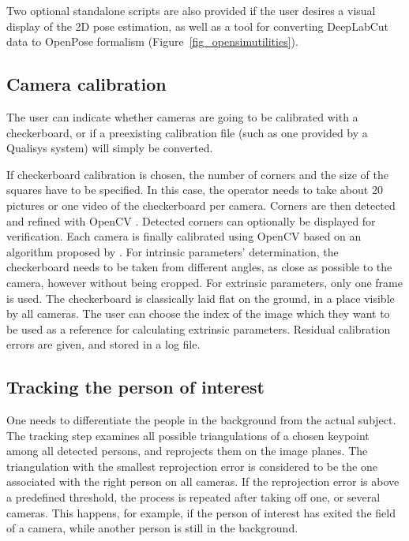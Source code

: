 
Two optional standalone scripts are also provided if the user desires a visual display of the 2D pose estimation, as well as a tool for converting DeepLabCut data to OpenPose formalism (Figure~\ref{fig_opensimutilities}).


\subsection{Camera calibration}

The user can indicate whether cameras are going to be calibrated with a checkerboard, or if a preexisting calibration file (such as one provided by a Qualisys system) will simply be converted.

If checkerboard calibration is chosen, the number of corners and the size of the squares have to be specified. In this case, the operator needs to take about 20 pictures or one video of the checkerboard per camera. Corners are then detected and refined with OpenCV \cite{Bradski2000}. Detected corners can optionally be displayed for verification. Each camera is finally calibrated using OpenCV based on an algorithm proposed by \cite{Zhang2000}. For intrinsic parameters' determination, the checkerboard needs to be taken from different angles, as close as possible to the camera, however without being cropped. For extrinsic parameters, only one frame is used. The checkerboard is classically laid flat on the ground, in a place visible by all cameras. The user can choose the index of the image which they want to be used as a reference for calculating extrinsic parameters. Residual calibration errors are given, and stored in a log file.


\subsection{Tracking the person of interest}\label{tracking}

One needs to differentiate the people in the background from the actual subject. The tracking step examines all possible triangulations of a chosen keypoint among all detected persons, and reprojects them on the image planes. The triangulation with the smallest reprojection error is considered to be the one associated with the right person on all cameras. If the reprojection error is above a predefined threshold, the process is repeated after taking off one, or several cameras. This happens, for example, if the person of interest has exited the field of a camera, while another person is still in the background.


